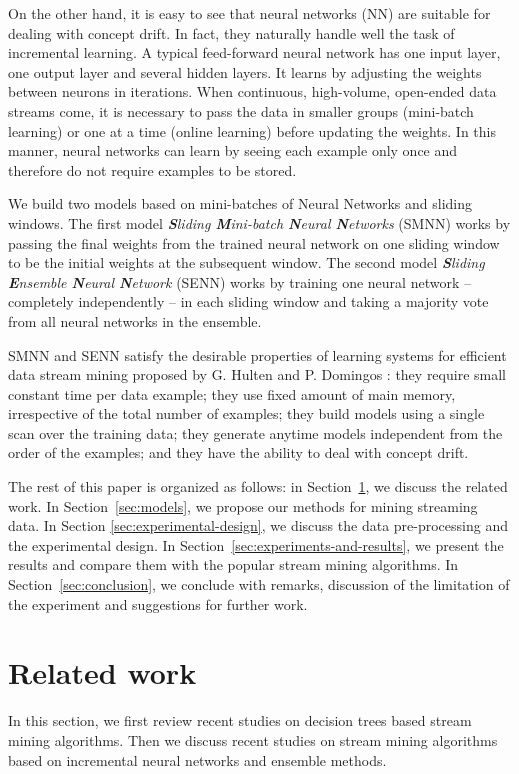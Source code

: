 \documentclass[conference]{IEEEtran}
\begin{document}
		On the other hand, it is easy to see that neural networks (NN) are suitable for dealing with concept drift. In fact, they naturally handle well the task of incremental learning. A typical feed-forward neural network has one input layer, one output layer and several hidden layers. It learns by adjusting the weights between neurons in iterations. When continuous, high-volume, open-ended data streams come, it is necessary to pass the data in smaller groups (mini-batch learning) or one at a time (online learning) before updating the weights. In this manner, neural networks can learn by seeing each example only once and therefore do not require examples to be stored. 
		
		We build two models based on mini-batches of Neural Networks and sliding windows.
		The first model \emph{\textbf{S}liding \textbf{M}ini-batch  \textbf{N}eural \textbf{N}etworks} (SMNN) works by passing the final weights from the trained neural network on one sliding window to be the initial weights at the subsequent window. The second model \emph{\textbf{S}liding \textbf{E}nsemble  \textbf{N}eural \textbf{N}etwork} (SENN) works by training one neural network -- completely independently -- in each sliding window and taking a majority vote from all neural networks in the ensemble. 
		
		SMNN and SENN satisfy the desirable properties of learning systems for efficient data stream mining proposed by G. Hulten and P. Domingos \cite{Domingos}: they require small constant time per data example; they use fixed amount of main memory, irrespective of the total number of examples; they build models using a single scan over the training data; they generate anytime models independent from the order of the examples; and they have the ability to deal with concept drift. 
		
		The rest of this paper is organized as follows: in Section~\ref{sec:related-work}, we discuss the related work. In Section~\ref{sec:models}, we propose our methods for mining streaming data. In Section \ref{sec:experimental-design}, we discuss the data pre-processing and the experimental design. In Section~\ref{sec:experiments-and-results}, we present the results and compare them with the popular stream mining algorithms. In Section~\ref{sec:conclusion}, we conclude with remarks, discussion of the limitation of the experiment and suggestions for further work.
		
		\section{Related work}
		\label{sec:related-work}
		In this section, we first review recent studies on decision trees based stream mining algorithms. Then we discuss recent studies on stream mining algorithms based on incremental neural networks and ensemble methods. 
		
\end{document}
